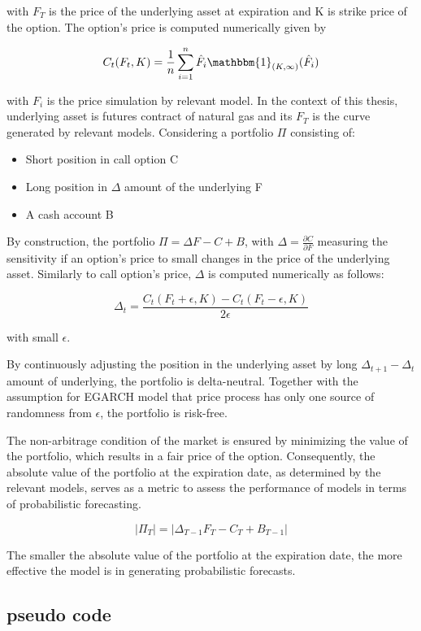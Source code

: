 \documentclass[12pt,a4paper]{article}
\numberwithin{equation}{section}
\begin{document}
with $F_T$ is the price of the underlying asset at expiration and K is strike price of the option. The option's price is computed numerically given by

\[C_t(F_t, K) = \frac{1}{n} \sum_{i=1}^n \hat{F}_i \mathbbm{1}_{(K, \infty)}(\hat{F}_i) \]

with $F_i$ is the price simulation by relevant model.
In the context of this thesis, underlying asset is futures contract of natural gas and its $F_T$ is the curve generated by relevant models.  Considering a portfolio $\Pi$ consisting of: 

\begin{itemize}
\item Short position in call option C
\item Long position in $\Delta$ amount of the underlying F
\item A cash account B
\end{itemize}

By construction, the portfolio $\Pi = \Delta F - C + B$, with $\Delta = \frac{\partial C}{\partial F}$ measuring the sensitivity if an option's price to small changes in the price of the underlying asset. Similarly to call option's price, $\Delta$ is computed numerically as follows:

\[\Delta_t = \frac{C_t(F_t+\epsilon, K) - C_t(F_t - \epsilon, K)}{2\epsilon}\] 

with small $\epsilon$.

By continuously adjusting the position in the underlying asset by long $\Delta_{t+1} - \Delta_t$ amount of underlying, the portfolio is delta-neutral. Together with the assumption for EGARCH model that price process has only one source of randomness from $\epsilon$, the portfolio is risk-free. 

The non-arbitrage condition of the market is ensured by minimizing the value of the portfolio, which results in a fair price of the option. Consequently, the absolute value of the portfolio at the expiration date, as determined by the relevant models, serves as a metric to assess the performance of models in terms of probabilistic forecasting. 

\[|\Pi_T| = |\Delta_{T-1} F_T - C_T + B_{T-1}|\]

The smaller the absolute value of the portfolio at the expiration date, the more effective the model is in generating probabilistic forecasts.


\subsection{pseudo code}
\end{document}
